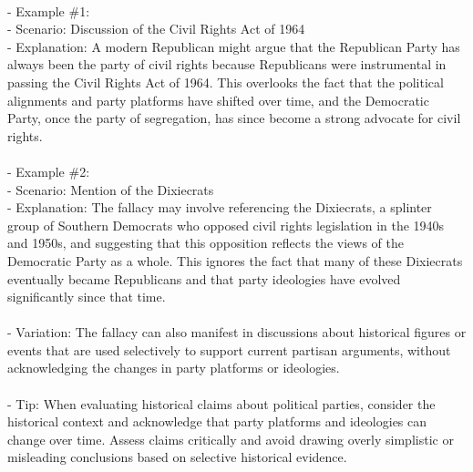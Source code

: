 \documentclass[a4paper,12pt,single,pdftex]{scrartcl}
\begin{document}
    
      
    \\

    
      - Example \#1:
    \\

    
        - Scenario: Discussion of the Civil Rights Act of 1964
    \\

    
        - Explanation: A modern Republican might argue that the Republican Party has always been the party of civil rights because Republicans were instrumental in passing the Civil Rights Act of 1964. This overlooks the fact that the political alignments and party platforms have shifted over time, and the Democratic Party, once the party of segregation, has since become a strong advocate for civil rights.
    \\

    
      
    \\

    
      - Example \#2:
    \\

    
        - Scenario: Mention of the Dixiecrats
    \\

    
        - Explanation: The fallacy may involve referencing the Dixiecrats, a splinter group of Southern Democrats who opposed civil rights legislation in the 1940s and 1950s, and suggesting that this opposition reflects the views of the Democratic Party as a whole. This ignores the fact that many of these Dixiecrats eventually became Republicans and that party ideologies have evolved significantly since that time.
    \\

    
      
    \\

    
      - Variation: The fallacy can also manifest in discussions about historical figures or events that are used selectively to support current partisan arguments, without acknowledging the changes in party platforms or ideologies.
    \\

    
      
    \\

    
      - Tip: When evaluating historical claims about political parties, consider the historical context and acknowledge that party platforms and ideologies can change over time. Assess claims critically and avoid drawing overly simplistic or misleading conclusions based on selective historical evidence.
    \\
\end{document}
